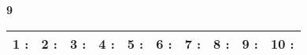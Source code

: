 \documentclass[a4paper, 11pt]{article}
\begin{document}
{\Large\bf 9 } \hspace{1.5cm}
\begin{tabular}{| l|l|l|l|l|l|l|l|l|l| }
\hline
{\large 1 }: \hspace*{0.5cm}
& {\large 2 }: \hspace*{0.5cm}
& {\large 3 }: \hspace*{0.5cm}
& {\large 4 }: \hspace*{0.5cm}
& {\large 5 }: \hspace*{0.5cm}
& {\large 6 }: \hspace*{0.5cm}
& {\large 7 }: \hspace*{0.5cm}
& {\large 8 }: \hspace*{0.5cm}
& {\large 9 }: \hspace*{0.5cm}
& {\large 10 }: \hspace*{0.5cm}
\\ 
 \hline
\end{tabular}
\vspace*{1cm} 
\end{document}
